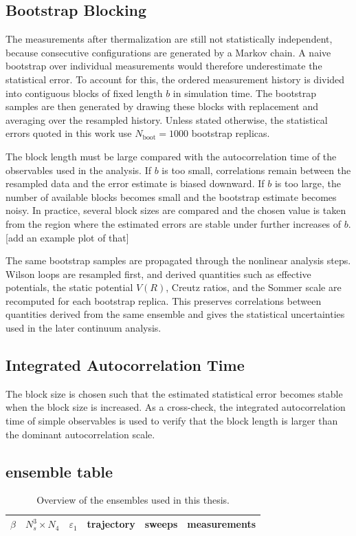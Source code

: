 \documentclass[12pt,a4paper,oneside,numbers=noenddot]{scrreprt}
\newcommand{\eps}{\varepsilon}
\begin{document}
\subsection{Bootstrap Blocking}

The measurements after thermalization are still not statistically independent,
because consecutive configurations are generated by a Markov chain. A naive
bootstrap over individual measurements would therefore underestimate the
statistical error. To account for this, the ordered measurement history is
divided into contiguous blocks of fixed length \(b\) in simulation time. The
bootstrap samples are then generated by drawing these blocks with replacement
and averaging over the resampled history. Unless stated otherwise, the
statistical errors quoted in this work use \(N_{\mathrm{boot}}=1000\) bootstrap
replicas.

The block length must be large compared with the autocorrelation time of the
observables used in the analysis. If \(b\) is too small, correlations remain
between the resampled data and the error estimate is biased downward. If \(b\)
is too large, the number of available blocks becomes small and the bootstrap
estimate becomes noisy. In practice, several block sizes are compared and the
chosen value is taken from the region where the estimated errors are stable
under further increases of \(b\). [add an example plot of that]

The same bootstrap samples are propagated through the nonlinear analysis steps.
Wilson loops are resampled first, and derived quantities such as effective
potentials, the static potential \(V(R)\), Creutz ratios, and the Sommer scale
are recomputed for each bootstrap replica. This preserves correlations between
quantities derived from the same ensemble and gives the statistical
uncertainties used in the later continuum analysis.

\subsection{Integrated Autocorrelation Time}
The block size is chosen such that the estimated statistical error becomes
stable when the block size is increased. As a cross-check, the integrated
autocorrelation time of simple observables is used to verify that the block
length is larger than the dominant autocorrelation scale.

\subsection{ensemble table}
\begin{table}
\centering
\begin{tabular}{cccccc}
\toprule
\(\beta\) & \(N_s^3\times N_4\) & \(\eps_1\) & trajectory & sweeps & measurements \\
\midrule
\bottomrule
\end{tabular}
\caption{Overview of the ensembles used in this thesis.}
\label{tab:ensembles}
\end{table}
\end{document}

